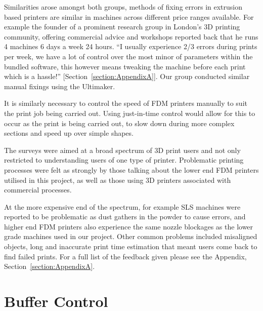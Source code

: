 \documentclass[11pt]{report} %
\begin{document}
Similarities arose amongst both groups, methods of fixing errors in extrusion based printers are similar in machines across different price ranges available. For example the founder of a prominent research group in London's 3D printing community, offering commercial advice and workshops reported back that he runs 4 machines 6 days a week 24 hours. ``I usually experience 2/3 errors during prints per week, we have a lot of control over the most minor of parameters within the bundled software, this however means tweaking the machine before each print which is a hassle!'' [Section~\ref{section:AppendixA}]. Our group conducted similar manual fixings using the Ultimaker. 

It is similarly necessary to control the speed of FDM printers manually to suit the print job being carried out. Using just-in-time control would allow for this to occur as the print is being carried out, to slow down during more complex sections and speed up  over simple shapes. 
 
The surveys were aimed at a broad spectrum of 3D print users and not only restricted to understanding users of one type of printer. Problematic printing processes were felt as strongly by those talking about the lower end FDM printers utilised in this project, as well as those using 3D printers associated with commercial processes. 

At the more expensive end of the spectrum, for example SLS machines were reported to be problematic as dust gathers in the powder to cause errors, and higher end FDM printers also experience the same nozzle blockages as the lower grade machines used in our project. Other common problems included misaligned objects, long and inaccurate print time estimation that meant users come back to find failed prints. For a full list of the feedback given please see the Appendix, Section~\ref{section:AppendixA}.






\section{Buffer Control}
\end{document}
